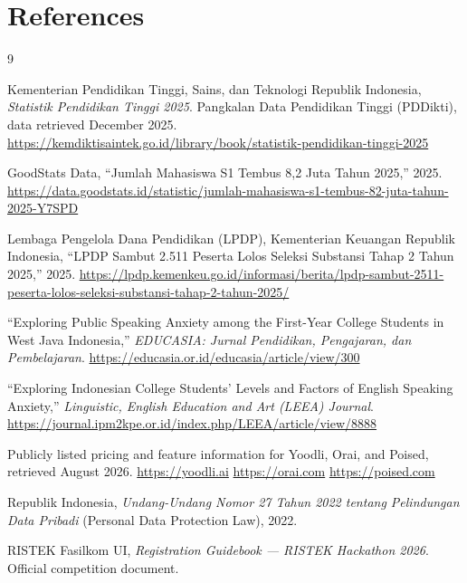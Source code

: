 %

\newpage
\section*{References}

{\fontsize{11}{15}\selectfont
\begin{thebibliography}{9}

Kementerian Pendidikan Tinggi, Sains, dan Teknologi Republik Indonesia,
\emph{Statistik Pendidikan Tinggi 2025}. Pangkalan Data Pendidikan Tinggi
(PDDikti), data retrieved December 2025.
\url{https://kemdiktisaintek.go.id/library/book/statistik-pendidikan-tinggi-2025}

GoodStats Data, ``Jumlah Mahasiswa S1 Tembus 8,2 Juta Tahun 2025,'' 2025.
\url{https://data.goodstats.id/statistic/jumlah-mahasiswa-s1-tembus-82-juta-tahun-2025-Y7SPD}

Lembaga Pengelola Dana Pendidikan (LPDP), Kementerian Keuangan Republik
Indonesia, ``LPDP Sambut 2.511 Peserta Lolos Seleksi Substansi Tahap 2 Tahun
2025,'' 2025.
\url{https://lpdp.kemenkeu.go.id/informasi/berita/lpdp-sambut-2511-peserta-lolos-seleksi-substansi-tahap-2-tahun-2025/}

``Exploring Public Speaking Anxiety among the First-Year College Students in
West Java Indonesia,'' \emph{EDUCASIA: Jurnal Pendidikan, Pengajaran, dan
Pembelajaran}.
\url{https://educasia.or.id/educasia/article/view/300}

``Exploring Indonesian College Students' Levels and Factors of English Speaking
Anxiety,'' \emph{Linguistic, English Education and Art (LEEA) Journal}.
\url{https://journal.ipm2kpe.or.id/index.php/LEEA/article/view/8888}

Publicly listed pricing and feature information for Yoodli, Orai, and Poised,
retrieved August 2026.
\url{https://yoodli.ai} \textbullet{} \url{https://orai.com}
\textbullet{} \url{https://poised.com}

Republik Indonesia, \emph{Undang-Undang Nomor 27 Tahun 2022 tentang
Pelindungan Data Pribadi} (Personal Data Protection Law), 2022.

RISTEK Fasilkom UI, \emph{Registration Guidebook --- RISTEK Hackathon 2026}.
Official competition document.

\end{thebibliography}}


